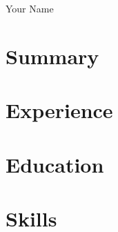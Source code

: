 \documentclass[10pt]{article}
\begin{document}
\begin{center}
  {\LARGE Your Name}
\end{center}

\section*{Summary}

\section*{Experience}

\section*{Education}

\section*{Skills}
\end{document}
